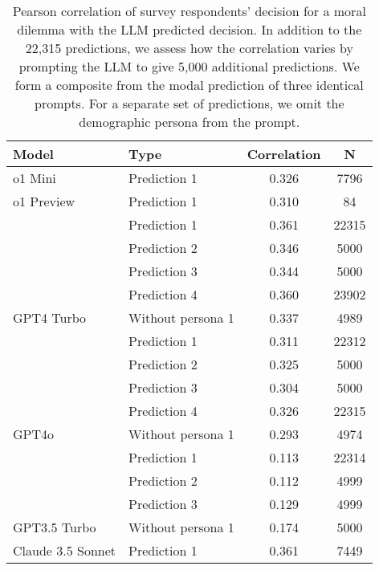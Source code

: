 \begin{table}[!h]
\centering
\caption{\label{tab:corr-tab}Pearson correlation of survey respondents' decision for a moral dilemma with the LLM predicted decision. In addition to the 22,315 predictions, we assess how the correlation varies by prompting the LLM to give 5,000 additional predictions. We form a composite from the modal prediction of three identical prompts. For a separate set of predictions, we omit the demographic persona from the prompt.}
\centering
\begin{tabular}[t]{llcc}
\toprule
Model & Type & Correlation & N\\
\midrule
o1 Mini & Prediction 1 & 0.326 & 7796\\
\cmidrule{1-4}
o1 Preview & Prediction 1 & 0.310 & 84\\
\cmidrule{1-4}
 & Prediction 1 & 0.361 & 22315\\
\cmidrule{2-4}
 & Prediction 2 & 0.346 & 5000\\
\cmidrule{2-4}
 & Prediction 3 & 0.344 & 5000\\
\cmidrule{2-4}
 & Prediction 4 & 0.360 & 23902\\
\cmidrule{2-4}
\multirow{-5}{*}{\raggedright\arraybackslash GPT4 Turbo} & Without persona 1 & 0.337 & 4989\\
\cmidrule{1-4}
 & Prediction 1 & 0.311 & 22312\\
\cmidrule{2-4}
 & Prediction 2 & 0.325 & 5000\\
\cmidrule{2-4}
 & Prediction 3 & 0.304 & 5000\\
\cmidrule{2-4}
 & Prediction 4 & 0.326 & 22315\\
\cmidrule{2-4}
\multirow{-5}{*}{\raggedright\arraybackslash GPT4o} & Without persona 1 & 0.293 & 4974\\
\cmidrule{1-4}
 & Prediction 1 & 0.113 & 22314\\
\cmidrule{2-4}
 & Prediction 2 & 0.112 & 4999\\
\cmidrule{2-4}
 & Prediction 3 & 0.129 & 4999\\
\cmidrule{2-4}
\multirow{-4}{*}{\raggedright\arraybackslash GPT3.5 Turbo} & Without persona 1 & 0.174 & 5000\\
\cmidrule{1-4}
Claude 3.5 Sonnet & Prediction 1 & 0.361 & 7449\\
\bottomrule
\end{tabular}
\end{table}
